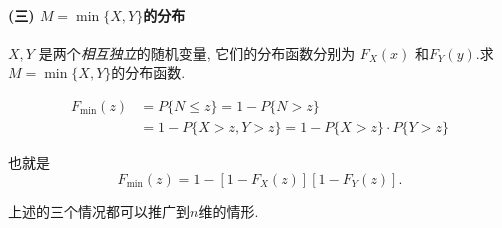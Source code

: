 \paragraph{(三) $M=\min \{X, Y\}$的分布}

$X, Y$ 是两个\emph{相互独立}的随机变量, 它们的分布函数分别为 $F_X(x)$ 和$F_Y(y)$.求 $M=\min \{X, Y\}$的分布函数.


   $$
\begin{aligned}
F_{\min }(z) & =P\{N \leq z\}=1-P\{N>z\} \\
& =1-P\{X>z, Y>z\}=1-P\{X>z\} \cdot P\{Y>z\}
\end{aligned}
$$

也就是
$$
F_{\min }(z)=1-\left[1-F_X(z)\right]\left[1-F_Y(z)\right] .
$$

上述的三个情况都可以推广到$n$维的情形.